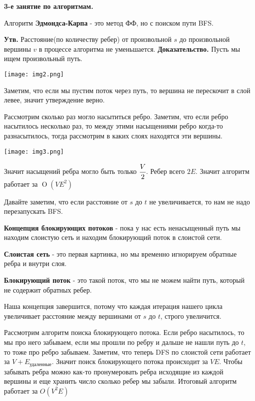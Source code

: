 \begin{center}
  \textbf{3-е занятие по алгоритмам.} 
\end{center}
  Алгоритм \textbf{Эдмондса-Карпа} - это метод ФФ, но с поиском пути BFS.

  \textbf{Утв.} Расстояние(по количеству ребер) от произвольной $s$ до произвольной вершины $v$ в процессе алгоритма не уменьшается. \textbf{Доказательство.} Пусть мы ищем произвольный путь.

  \begin{center}
    \texttt{[image: img2.png]}
  \end{center}
  
  Заметим, что если мы пустим поток через путь, то вершина не перескочит в слой левее, значит утверждение верно.

  Рассмотрим сколько раз могло насытиться ребро. Заметим, что если ребро насытилось несколько раз, то между этими насыщениями ребро когда-то разнасытилось, тогда рассмотрим в каких слоях находятся эти вершины.

  \begin{center}
    \texttt{[image: img3.png]}
  \end{center}

  Значит насыщений ребра могло быть только $\cfrac{V}{2}$. Ребер всего $2E$. Значит алгоритм работает за $\operatorname{O} (VE^2)$

  Давайте заметим, что если расстояние от $s$ до $t$ не увеличивается, то нам не надо перезапускать BFS.

  \textbf{Концепция блокирующих потоков} - пока у нас есть ненасыщенный путь мы находим слоистую сеть и находим блокирующий поток в слоистой сети.

  \textbf{Слоистая сеть} - это первая картинка, но мы временно игнорируем обратные ребра и внутри слоя. 

  \textbf{Блокирующий поток} - это такой поток, что мы не можем найти путь, который не содержит обратных ребер.

  Наша концепция завершится, потому что каждая итерация нашего цикла увеличивает расстояние между вершинами от $s$ до $t$, строго увеличится.

  Рассмотрим алгоритм поиска блокирующего потока. Если ребро насытилось, то мы про него забываем, если мы прошли по ребру и дальше не нашли путь до $t$, то тоже про ребро забываем. Заметим, что теперь DFS по слоистой сети работает за $V + E_{\text{удаленные}}$. Значит поиск блокирующего потока происходит за  $VE$. Чтобы забывать ребра можно как-то пронумеровать ребра исходящие из каждой вершины и еще хранить число сколько ребер мы забыли. Итоговый алгоритм работает за $O(V^2E)$

